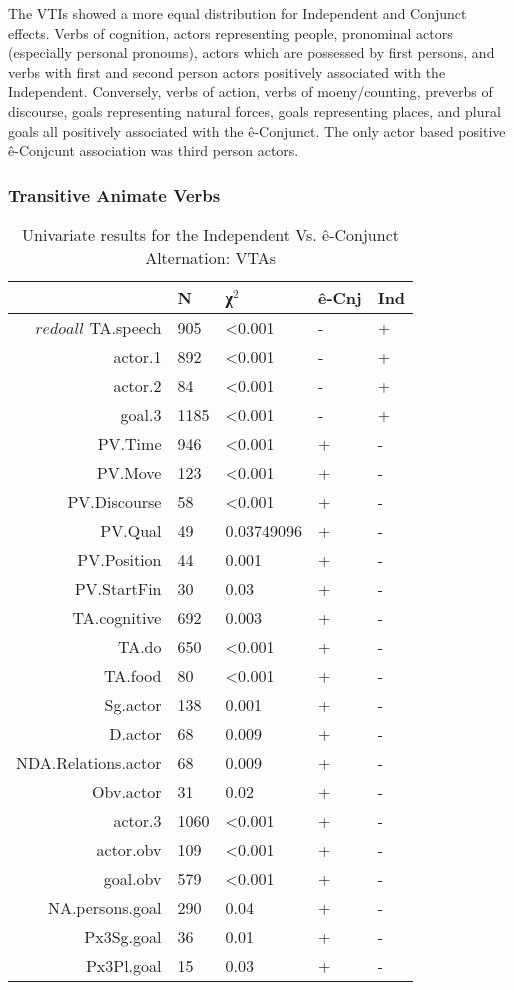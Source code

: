 The VTIs showed a more equal distribution for Independent and Conjunct effects. Verbs of cognition, actors representing people, pronominal actors (especially personal pronouns), actors which are possessed by first persons, and verbs with first and second person actors positively associated with the Independent. Conversely, verbs of action, verbs of moeny/counting, preverbs of discourse, goals representing natural forces, goals representing places, and plural goals all positively associated with the ê-Conjunct. The only actor based positive ê-Conjcunt association was third person actors.
\FloatBarrier

\FloatBarrier

\subsubsection{Transitive Animate Verbs}

\begin{table}[H]
  \centering
  \footnotesize
\begin{tabular}{rllll}
    \toprule
&N&χ$^{2}$&ê-Cnj&Ind\\
\midrule
$redoall$
TA.speech & 905 & \textless{}0.001 & - & + \\
actor.1 & 892 & \textless{}0.001 & - & + \\
actor.2 & 84 & \textless{}0.001 & - & + \\
goal.3 & 1185 & \textless{}0.001 & - & + \\

PV.Time & 946 & \textless{}0.001 & + & - \\
PV.Move & 123 & \textless{}0.001 & + & - \\
PV.Discourse & 58 & \textless{}0.001 & + & - \\
PV.Qual & 49 & 0.03749096 & + & - \\
PV.Position & 44 & 0.001 & + & - \\
PV.StartFin & 30 & 0.03 & + & - \\
TA.cognitive & 692 & 0.003 & + & - \\
TA.do & 650 & \textless{}0.001 & + & - \\
TA.food & 80 & \textless{}0.001 & + & - \\
Sg.actor & 138 & 0.001 & + & - \\
D.actor & 68 & 0.009 & + & - \\
NDA.Relations.actor & 68 & 0.009 & + & - \\
Obv.actor & 31 & 0.02 & + & - \\
actor.3 & 1060 & \textless{}0.001 & + & - \\
actor.obv & 109 & \textless{}0.001 & + & - \\
goal.obv & 579 & \textless{}0.001 & + & - \\
NA.persons.goal & 290 & 0.04 & + & - \\
Px3Sg.goal & 36 & 0.01 & + & - \\
Px3Pl.goal & 15 & 0.03 & + & - \\
  \bottomrule
  \end{tabular}
  \caption{
   Univariate results for the Independent Vs. ê-Conjunct Alternation: VTAs \\ \label{tab:taiveuni}
  }
\end{table}

